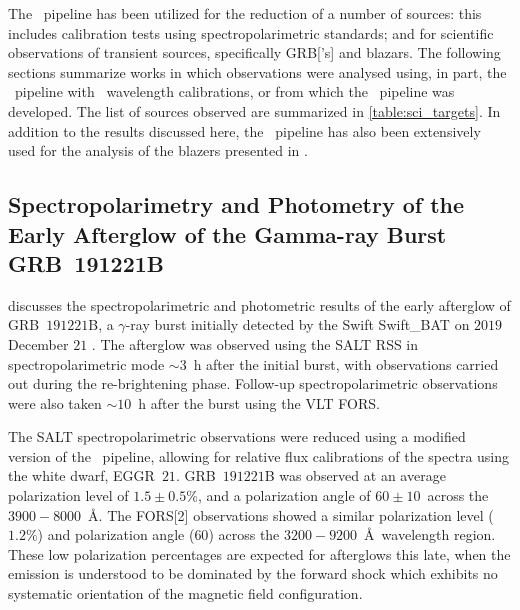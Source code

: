 The \stops\ pipeline has been utilized for the reduction of a number of sources: this includes calibration tests using spectropolarimetric standards; and for scientific observations of transient sources, specifically \gls{GRB}['s] and blazars.
The following sections summarize works in which observations were analysed using, in part, the \stops\ pipeline with \iraf\ wavelength calibrations, or from which the \stops\ pipeline was developed.
The list of sources observed are summarized in \autoref{table:sci_targets}.
In addition to the results discussed here, the \stops\ pipeline has also been extensively used for the analysis of the blazers presented in \citet{Barnard_HEASA2021, Barnard_2024}.



\subsection[Buckley et al.\ (2019)]{%
    Spectropolarimetry and Photometry of the Early Afterglow of the Gamma-ray Burst GRB~191221B\\
    \citep{Buckley191221B}
}

\citet{Buckley191221B} discusses the spectropolarimetric and photometric results of the early afterglow of GRB~$191221$B, a $\gamma$-ray burst initially detected by the \gls{Swift} \gls{Swift_BAT} \citep{swift_bat} on $2019$ December $21$ \citep{grb191221b}.
The afterglow was observed using the \gls{SALT} \gls{RSS} in spectropolarimetric mode $\sim 3$~h after the initial burst, with observations carried out during the re-brightening phase.
Follow-up spectropolarimetric observations were also taken $\sim 10$~h after the burst using the \gls{VLT} \gls{FORS}.

The \gls{SALT} spectropolarimetric observations were reduced using a modified version of the \polsalt\ pipeline, allowing for relative flux calibrations of the spectra using the white dwarf, EGGR~$21$.
GRB~$191221$B was observed at an average polarization level of $1.5 \pm 0.5\%$, and a polarization angle of $60 \pm 10$\degree\ across the $3900 - 8000$~\AA.
The \gls{FORS}[2] observations showed a similar polarization level ($1.2\%$) and polarization angle ($60$\degree) across the $3200 - 9200$~\AA\ wavelength region.
These low polarization percentages are expected for afterglows this late, when the emission is understood to be dominated by the forward shock which exhibits no systematic orientation of the magnetic field configuration.

